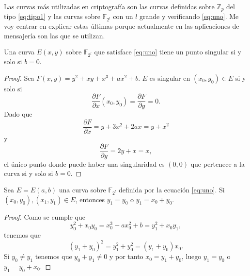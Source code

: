 Las curvas más utilizadas en criptografía son las curvas definidas sobre $\mathbb{Z}_p$ del tipo \eqref{eq:tipo1} y las curvas sobre $\mathbb{F}_{2^l}$ con un $l$ grande y verificando \eqref{eq:uno}. Me voy centrar en explicar estas últimas porque actualmente en las aplicaciones de mensajería son las que se utilizan.

\begin{proposicion}
	Una curva $E(x,y)$ sobre $\mathbb{F}_{2^l}$ que satisface \eqref{eq:uno} tiene un punto singular si y solo si $b=0$.
\end{proposicion}
\begin{proof}
	Sea $F(x,y)=y^2+xy+x^3+ax^2+b$. $E$ es singular en $(x_0,y_0)\in E$ si y solo si  
	$$
		\frac{\partial F}{\partial x}(x_0,y_0)=\frac{\partial F}{\partial y}=0.
	$$
	Dado que
	$$
		\frac{\partial F}{\partial x} = y+3x^2+2ax=y+x^2
	$$
	y
	$$
		\frac{\partial F}{\partial y}=2y+x=x,
	$$
	el único punto donde puede haber una singularidad es $(0,0)$ que pertenece a la curva si y solo si $b=0$.
\end{proof}

\begin{lema}
	Sea $E=E(a,b)$ una curva sobre $\mathbb{F}_{2^l}$ definida por la ecuación \eqref{eq:uno}. Si $(x_0,y_0), (x_1,y_1)\in E$, entonces $y_1=y_0$ o $y_1=x_0+y_0$.
\end{lema}
\begin{proof}
	Como se cumple que
	$$
		y_0^2+x_0y_0=x_0^3+ax_0^2+b=y_1^2+x_0y_1,
	$$
	tenemos que
	$$
		(y_1+y_0)^2=y_1^2+y_0^2=(y_1+y_0)x_0.
	$$
	Si $y_0\neq y_1$ tenemos que $y_0+y_1\neq0$ y por tanto $x_0=y_1+y_0$, luego $y_1=y_0$ o $y_1=y_0+x_0$.
\end{proof}

